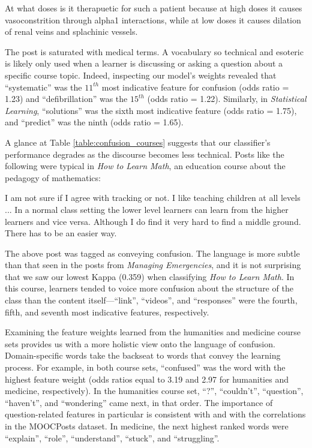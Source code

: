 \documentclass{edm_template}
\begin{document}
\vspace{-10pt}
\begin{displayquote}
At what doses is it therapuetic for such a patient because at high doses it causes vasoconstrition through alpha1 interactions, while at low doses it causes dilation of renal veins and splachinic vessels.
\end{displayquote}
\vspace{-10pt}

The post is saturated with medical terms. A vocabulary so technical and esoteric is likely only used when a learner is discussing or asking a question about a specific course topic. Indeed, inspecting our model's weights revealed that ``systematic'' was the $11^{th}$ most indicative feature for confusion (odds ratio = 1.23) and ``defibrillation'' was the $15^{th}$ (odds ratio = 1.22). Similarly, in \emph{Statistical Learning}, ``solutions'' was the sixth most indicative feature (odds ratio = 1.75), and ``predict'' was the ninth (odds ratio = 1.65).

A glance at Table \ref{table:confusion_courses} suggests that our classifier's performance degrades as the discourse becomes less technical. Posts like the following were typical in \emph{How to Learn Math}, an education course about the pedagogy of mathematics:

\vspace{-10pt}
\begin{displayquote}
I am not sure if I agree with tracking or not.  I like teaching children at all levels ...  In a normal class setting the lower level learners can learn from the higher learners and vice versa.  Although I do find it very hard to find a middle ground. There has to be an easier way.
\vspace{-10pt}
\end{displayquote}

The above post was tagged as conveying confusion. The language is more subtle than that seen in the posts from \emph{Managing Emergencies}, and it is not surprising that we saw our lowest Kappa (0.359) when classifying \emph{How to Learn Math}. In this course, learners tended to voice more confusion about the structure of the class than the content itself---``link'', ``videos'', and ``responses'' were the fourth, fifth, and seventh most indicative features, respectively.

Examining the feature weights learned from the humanities and medicine course sets provides us with a more holistic view onto the language of confusion. Domain-specific words take the backseat to words that convey the learning process. For example, in both course sets, ``confused'' was the word with the highest feature weight (odds ratios equal to 3.19 and 2.97 for humanities and medicine, respectively). In the humanities course set, ``?'', ``couldn't'', ``question'', ``haven't'', and ``wondering'' came next, in that order. The importance of question-related features in particular is consistent with \cite{wilson1989learning} and with the correlations in the MOOCPosts dataset. In medicine, the next highest ranked words were ``explain'', ``role'', ``understand'', ``stuck'', and ``struggling''.
\end{document}
